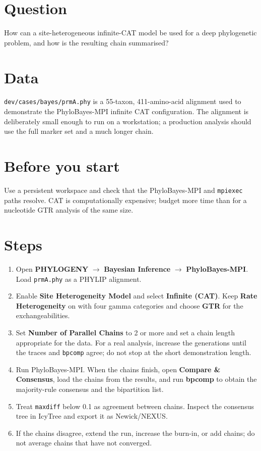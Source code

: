 \documentclass[11pt]{report}
\begin{document}
\section{Question}
How can a site-heterogeneous infinite-CAT model be used for a deep
phylogenetic problem, and how is the resulting chain summarised?

\section{Data}
\texttt{dev/cases/bayes/prmA.phy} is a 55-taxon, 411-amino-acid alignment
used to demonstrate the PhyloBayes-MPI infinite CAT configuration. The
alignment is deliberately small enough to run on a workstation; a production
analysis should use the full marker set and a much longer chain.

\section{Before you start}
Use a persistent workspace and check that the PhyloBayes-MPI and
\texttt{mpiexec} paths resolve. CAT is computationally expensive; budget more
time than for a nucleotide GTR analysis of the same size.

\section{Steps}
\begin{enumerate}
  \item Open \textbf{PHYLOGENY} $\rightarrow$ \textbf{Bayesian Inference}
  $\rightarrow$ \textbf{PhyloBayes-MPI}. Load \texttt{prmA.phy} as a PHYLIP
  alignment.
  \item Enable \textbf{Site Heterogeneity Model} and select \textbf{Infinite
  (CAT)}. Keep \textbf{Rate Heterogeneity} on with four gamma categories and
  choose \textbf{GTR} for the exchangeabilities.
  \item Set \textbf{Number of Parallel Chains} to 2 or more and set a chain
  length appropriate for the data. For a real analysis, increase the
  generations until the traces and \texttt{bpcomp} agree; do not stop at the
  short demonstration length.
  \item Run PhyloBayes-MPI. When the chains finish, open \textbf{Compare \&
  Consensus}, load the chains from the results, and run \textbf{bpcomp} to
  obtain the majority-rule consensus and the bipartition list.
  \item Treat \texttt{maxdiff} below 0.1 as agreement between chains. Inspect
  the consensus tree in IcyTree and export it as Newick/NEXUS.
  \item If the chains disagree, extend the run, increase the burn-in, or add
  chains; do not average chains that have not converged.
\end{enumerate}
\end{document}
